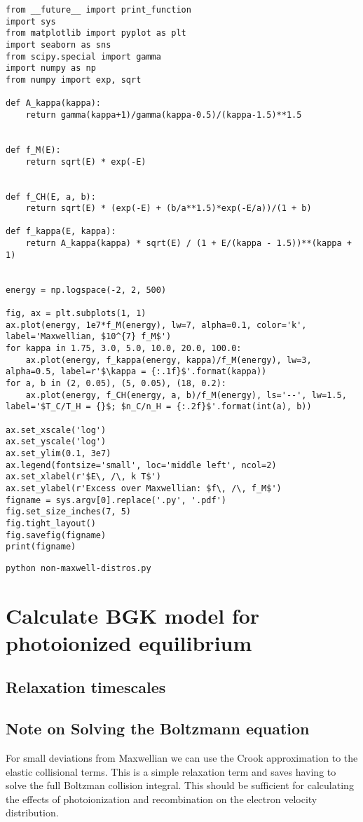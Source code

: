 \documentclass[11pt]{article}
\begin{document}
\begin{verbatim}
from __future__ import print_function
import sys
from matplotlib import pyplot as plt
import seaborn as sns
from scipy.special import gamma
import numpy as np
from numpy import exp, sqrt

def A_kappa(kappa):
    return gamma(kappa+1)/gamma(kappa-0.5)/(kappa-1.5)**1.5


def f_M(E):
    return sqrt(E) * exp(-E)


def f_CH(E, a, b):
    return sqrt(E) * (exp(-E) + (b/a**1.5)*exp(-E/a))/(1 + b)

def f_kappa(E, kappa):
    return A_kappa(kappa) * sqrt(E) / (1 + E/(kappa - 1.5))**(kappa + 1)


energy = np.logspace(-2, 2, 500)

fig, ax = plt.subplots(1, 1)
ax.plot(energy, 1e7*f_M(energy), lw=7, alpha=0.1, color='k', label='Maxwellian, $10^{7} f_M$')
for kappa in 1.75, 3.0, 5.0, 10.0, 20.0, 100.0:
    ax.plot(energy, f_kappa(energy, kappa)/f_M(energy), lw=3, alpha=0.5, label=r'$\kappa = {:.1f}$'.format(kappa))
for a, b in (2, 0.05), (5, 0.05), (18, 0.2):
    ax.plot(energy, f_CH(energy, a, b)/f_M(energy), ls='--', lw=1.5, label='$T_C/T_H = {}$; $n_C/n_H = {:.2f}$'.format(int(a), b))

ax.set_xscale('log')
ax.set_yscale('log')
ax.set_ylim(0.1, 3e7)
ax.legend(fontsize='small', loc='middle left', ncol=2)
ax.set_xlabel(r'$E\, /\, k T$')
ax.set_ylabel(r'Excess over Maxwellian: $f\, /\, f_M$')
figname = sys.argv[0].replace('.py', '.pdf')
fig.set_size_inches(7, 5)
fig.tight_layout()
fig.savefig(figname)
print(figname)
\end{verbatim}

\begin{verbatim}
python non-maxwell-distros.py
\end{verbatim}

\section{Calculate BGK model for photoionized equilibrium}
\label{sec:orgheadline28}

\subsection{Relaxation timescales}
\label{sec:orgheadline25}
\subsection{Note on Solving the Boltzmann equation}
\label{sec:orgheadline26}
For small deviations from Maxwellian we can use the Crook approximation to the elastic collisional terms. This is a simple relaxation term and saves having to solve the full Boltzman collision integral. This should be sufficient for calculating the effects of photoionization and recombination on the electron velocity distribution.
\end{document}
